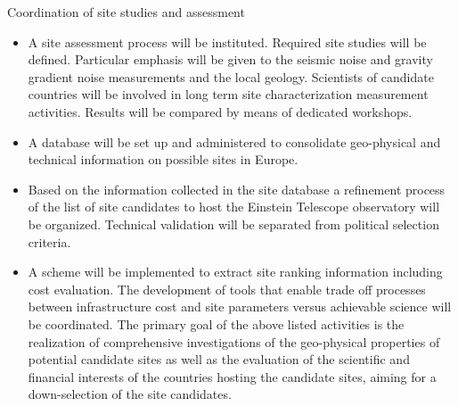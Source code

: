 Coordination of site studies and assessment 
\begin{itemize}
\item{} A site assessment process will be instituted. Required site studies will be defined. Particular emphasis will be given to the seismic noise and gravity gradient noise measurements and the local geology. Scientists of candidate countries will be involved in long term site characterization measurement activities. Results will be compared by means of dedicated workshops. 
\item{} A database will be set up and administered to consolidate geo-physical and technical information on possible sites in Europe. 
\item{} Based on the information collected in the site database a refinement process of the list of site candidates to host the Einstein Telescope observatory will be organized. Technical validation will be separated from political selection criteria. 
\item{} A scheme will be implemented to extract site ranking information including cost evaluation. The development of tools that enable trade off processes between infrastructure cost and site parameters versus achievable science will be coordinated. 
The primary goal of the above listed activities is the realization of comprehensive investigations of the geo-physical properties of potential candidate sites as well as the evaluation of the scientific and financial interests of the countries hosting the candidate sites, aiming for a down-selection of the site candidates.
\end{itemize} 

\FloatBarrier
